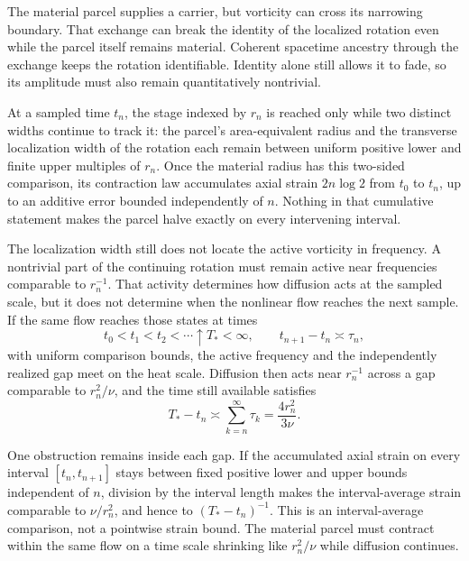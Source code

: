 The material parcel supplies a carrier, but vorticity can cross its narrowing boundary. That exchange can break the identity of the localized rotation even while the parcel itself remains material. Coherent spacetime ancestry through the exchange keeps the rotation identifiable. Identity alone still allows it to fade, so its amplitude must also remain quantitatively nontrivial.

At a sampled time \(t_n\), the stage indexed by \(r_n\) is reached only while two distinct widths continue to track it: the parcel's area-equivalent radius and the transverse localization width of the rotation each remain between uniform positive lower and finite upper multiples of \(r_n\). Once the material radius has this two-sided comparison, its contraction law accumulates axial strain \(2n\log 2\) from \(t_0\) to \(t_n\), up to an additive error bounded independently of \(n\). Nothing in that cumulative statement makes the parcel halve exactly on every intervening interval.

The localization width still does not locate the active vorticity in frequency. A nontrivial part of the continuing rotation must remain active near frequencies comparable to \(r_n^{-1}\). That activity determines how diffusion acts at the sampled scale, but it does not determine when the nonlinear flow reaches the next sample. If the same flow reaches those states at times
\[
  t_0<t_1<t_2<\cdots\uparrow T_*<\infty,
  \qquad
  t_{n+1}-t_n\asymp\tau_n,
\]
with uniform comparison bounds, the active frequency and the independently realized gap meet on the heat scale. Diffusion then acts near \(r_n^{-1}\) across a gap comparable to \(r_n^2/\nu\), and the time still available satisfies
\[
  T_*-t_n
  \asymp
  \sum_{k=n}^{\infty}\tau_k
  =
  \frac{4r_n^2}{3\nu}.
\]

One obstruction remains inside each gap. If the accumulated axial strain on every interval \([t_n,t_{n+1}]\) stays between fixed positive lower and upper bounds independent of \(n\), division by the interval length makes the interval-average strain comparable to \(\nu/r_n^2\), and hence to \((T_*-t_n)^{-1}\). This is an interval-average comparison, not a pointwise strain bound. The material parcel must contract within the same flow on a time scale shrinking like \(r_n^2/\nu\) while diffusion continues.
